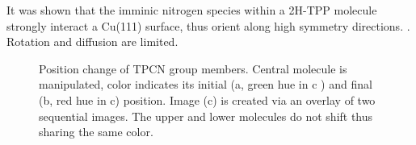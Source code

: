 It was shown that the imminic nitrogen species within a 2H-TPP molecule strongly interact a Cu(111) surface, thus orient along high symmetry directions. .\cite{haq_clean_2011, buchner_diffusion_2011, gonzalez-moreno_following_2011, diller_self-metalation_2012, ditze_activation_2012,rojas_self-assembly_2010} Rotation and diffusion are limited.
\begin{figure}[!h]
 \centering
 \caption{Position change of TPCN group members. Central molecule is manipulated, color indicates its initial (a, green hue in c ) and final (b, red hue in c) position. Image (c) is created via an overlay of two sequential images. The upper and lower molecules do not shift thus sharing the same color.}
 \label{fig:TPCN-manipulation}
\end{figure}

